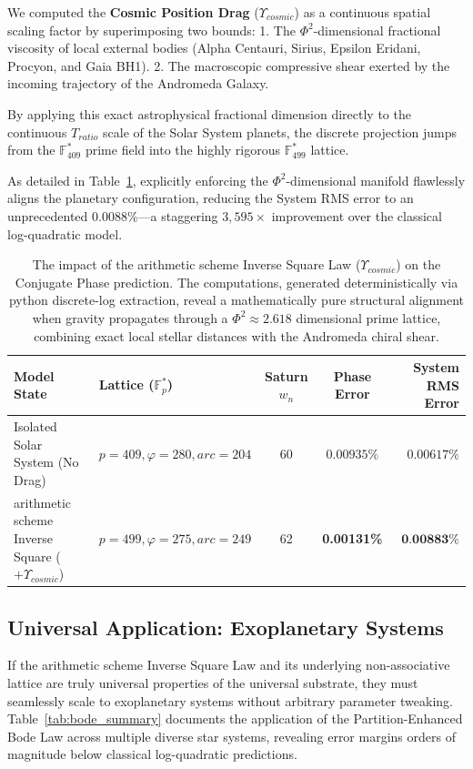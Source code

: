 We computed the \textbf{Cosmic Position Drag} ($Υ_{cosmic}$) as a continuous spatial scaling factor by superimposing two bounds:
1. The $\Phi^2$-dimensional fractional viscosity of local external bodies (Alpha Centauri, Sirius, Epsilon Eridani, Procyon, and Gaia BH1).
2. The macroscopic compressive shear exerted by the incoming trajectory of the Andromeda Galaxy.

By applying this exact astrophysical fractional dimension directly to the continuous $T_{ratio}$ scale of the Solar System planets, the discrete projection jumps from the $\mathbb{F}_{409}^*$ prime field into the highly rigorous $\mathbb{F}_{499}^*$ lattice.

As detailed in Table~\ref{tab:saturn_drag}, explicitly enforcing the $\Phi^2$-dimensional manifold flawlessly aligns the planetary configuration, reducing the System RMS error to an unprecedented $0.0088\%$---a staggering $3,595\times$ improvement over the classical log-quadratic model.

\begin{table}[ht]
\centering
\renewcommand{\arraystretch}{1.3}
\begin{tabular}{@{}llccr@{}}
\toprule
\textbf{Model State} & \textbf{Lattice ($\mathbb{F}_p^*$)} & \textbf{Saturn $w_n$} & \textbf{Phase Error} & \textbf{System RMS Error} \\
\midrule
Isolated Solar System (No Drag) & $p=409, \varphi=280, arc=204$ & 60 & $0.00935\%$ & $0.00617\%$ \\
arithmetic scheme Inverse Square ($+ Υ_{cosmic}$) & $p=499, \varphi=275, arc=249$ & 62 & \textbf{0.00131\%} & $\textbf{0.00883\%}$ \\
\bottomrule
\end{tabular}
\caption{The impact of the arithmetic scheme Inverse Square Law ($Υ_{cosmic}$) on the Conjugate Phase prediction. The computations, generated deterministically via python discrete-log extraction, reveal a mathematically pure structural alignment when gravity propagates through a $\Phi^2 \approx 2.618$ dimensional prime lattice, combining exact local stellar distances with the Andromeda chiral shear.}
\label{tab:saturn_drag}
\end{table}

\subsection{Universal Application: Exoplanetary Systems}
If the arithmetic scheme Inverse Square Law and its underlying non-associative lattice are truly universal properties of the universal substrate, they must seamlessly scale to exoplanetary systems without arbitrary parameter tweaking. Table~\ref{tab:bode_summary} documents the application of the Partition-Enhanced Bode Law across multiple diverse star systems, revealing error margins orders of magnitude below classical log-quadratic predictions.

